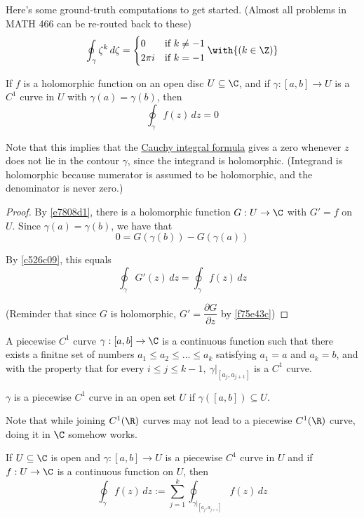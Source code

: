 Here's some ground-truth computations to get started. (Almost all problems in
MATH 466 can be re-routed back to these)
$$
  \oint_\gamma\zeta^k\,d\zeta=\begin{cases}
    0      & \text{if }k\neq-1 \\
    2\pi i & \text{if }k=-1
  \end{cases}\with{(k\in\Z)}
$$

\label{fb87a78}

If $f$ is a holomorphic function on an open disc $U\subseteq\C$, and if
$\gamma:[a,b]\to U$ is a $C^1$ curve in $U$ with $\gamma(a)=\gamma(b)$, then
$$
  \oint_\gamma f(z)\,dz=0
$$

Note that this implies that the \href{e50677f}{Cauchy integral formula} gives a
zero whenever $z$ does not lie in the contour $\gamma$, since the integrand is
holomorphic. (Integrand is holomorphic because numerator is assumed to be
holomorphic, and the denominator is never zero.)

\begin{proof}
  By \autoref{e7808d1}, there is a holomorphic function
  $G:U\to\C$ with $G'=f$ on $U$. Since $\gamma(a)=\gamma(b)$, we have
  that
  $$
    0=G(\gamma(b))-G(\gamma(a))
  $$

  By \autoref{c526c09}, this equals
  $$
    \oint_\gamma G'(z)\,dz=\oint_\gamma f(z)\,dz
  $$

  (Reminder that since $G$ is holomorphic, $G'=\dfrac{\partial G}{\partial z}$
  by \autoref{f75e43c})
\end{proof}

\label{baf22ac}

A piecewise $C^1$ curve $\gamma:[a,b]\to\C$ is a continuous function such that
there exists a finitne set of numbers $a_1\leq a_2\leq\ldots\leq a_k$
satisfying $a_1=a$ and $a_k=b$, and with the property that for every $i\leq
j\leq k-1,\ \gamma|_{[a_j,a_{j+1}]}$ is a $C^1$ curve.

$\gamma$ is a piecewise $C^1$ curve in an open set $U$ if
$\gamma([a,b])\subseteq U$.

Note that while joining $C^1(\R)$ curves may not lead to a piecewise $C^1(\R)$
curve, doing it in $\C$ somehow works.

\label{a99ad34}

If $U\subseteq\C$ is open and $\gamma:[a,b]\to U$ is a piecewise $C^1$ curve in
$U$ and if $f:U\to\C$ is a continuous function on $U$, then
$$
  \oint_\gamma f(z)\,dz:=\sum_{j=1}^k\oint_{\gamma|_{[a_j,a_{j+1}]}}
  f(z)\,dz
$$

